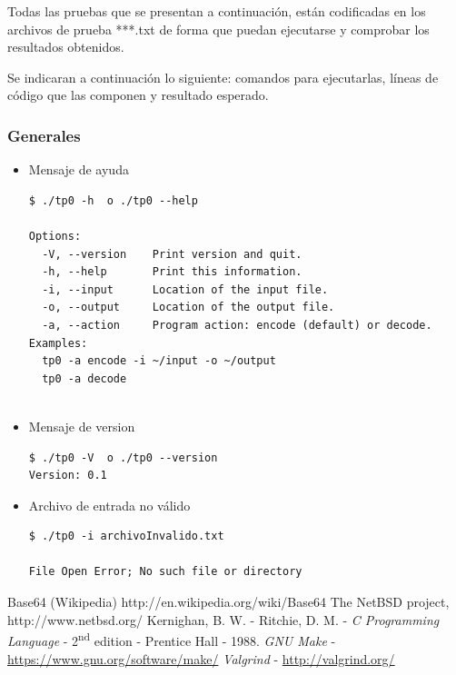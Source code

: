 \documentclass[10pt,a4paper]{article}
\begin{document}
Todas las pruebas que se presentan a continuación, están codificadas en los archivos de prueba ***.txt de forma que puedan ejecutarse y comprobar los resultados obtenidos.

Se indicaran a continuación lo siguiente: comandos para ejecutarlas, líneas de código que las componen y resultado esperado.


\subsubsection{Generales}


\begin{itemize}
    \item Mensaje de ayuda\\
    
\begin{lstlisting}
$ ./tp0 -h  o ./tp0 --help

Options:
  -V, --version    Print version and quit.
  -h, --help       Print this information.
  -i, --input      Location of the input file.
  -o, --output     Location of the output file.
  -a, --action     Program action: encode (default) or decode.
Examples:
  tp0 -a encode -i ~/input -o ~/output
  tp0 -a decode


\end{lstlisting}     
     
	\item Mensaje de version\\

            \begin{lstlisting}
$ ./tp0 -V  o ./tp0 --version
Version: 0.1
             \end{lstlisting}  
         
         
    \item Archivo de entrada no válido
            \begin{lstlisting}
$ ./tp0 -i archivoInvalido.txt

File Open Error; No such file or directory

             \end{lstlisting}  

\end{itemize}

\newpage


\begin{thebibliography}{10}
	\bibitem{}Base64 (Wikipedia) http://en.wikipedia.org/wiki/Base64
	\bibitem{}The NetBSD project, http://www.netbsd.org/
	 Kernighan, B. W. - Ritchie, D. M. - \emph{C Programming Language} - 2\textsuperscript{nd} edition - Prentice Hall - 1988.
	 \emph{GNU Make} - \hyperlink{make}{https://www.gnu.org/software/make/}
	 \emph{Valgrind} - \hyperlink{valgrind}{http://valgrind.org/}

\end{thebibliography}
\end{document}
